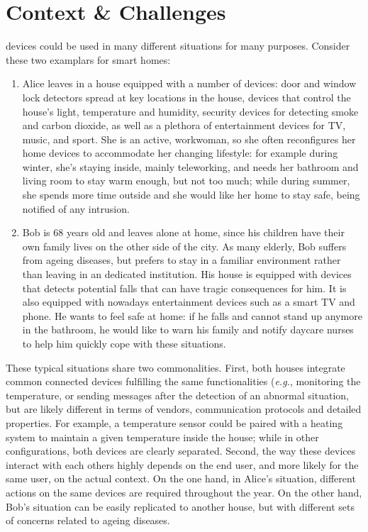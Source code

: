 \section{Context \& Challenges}
\label{sec:Context-Challenges}

\IOT devices could be used in many different situations for many purposes. Consider these two examplars for smart homes:
\begin{enumerate}
	\item Alice leaves in a house equipped with a number of devices: door and window lock detectors spread at key locations in the house, devices that control the house's light, temperature and humidity, security devices for detecting smoke and carbon dioxide, as well as a plethora of entertainment devices for TV, music, and sport. She is an active, workwoman, so she often reconfigures her home devices to accommodate her changing lifestyle: for example during winter, she's staying inside, mainly teleworking, and needs her bathroom and living room to stay warm enough, but not too much; while during summer, she spends more time outside and she would like her home to stay safe, being notified of any intrusion.
	
	\item Bob is 68 years old and leaves alone at home, since his children have their own family lives on the other side of the city. As many elderly, Bob suffers from ageing diseases, but prefers to stay in a familiar environment rather than leaving in an dedicated institution. His house is equipped with devices that detects potential falls that can have tragic consequences for him. It is also equipped with nowadays entertainment devices such as a smart TV and phone. He wants to feel safe at home: if he falls and cannot stand up anymore in the bathroom, he would like to warn his family and notify daycare nurses to help him quickly cope with these situations.
\end{enumerate}

These typical situations share two commonalities. First, both houses integrate common connected devices fulfilling the same functionalities (\textit{e.g.}, monitoring the temperature, or sending messages after the detection of an abnormal situation, but are likely different in terms of vendors, communication protocols and detailed properties. For example, a temperature sensor could be paired with a heating system to maintain a given temperature inside the house; while in other configurations, both devices are clearly separated. Second, the way these devices interact with each others highly depends on the end user, and more likely for the same user, on the actual context. On the one hand, in Alice's situation, different actions on the same devices are required throughout the year. On the other hand, Bob's situation can be easily replicated to another house, but with different sets of concerns related to ageing diseases.

